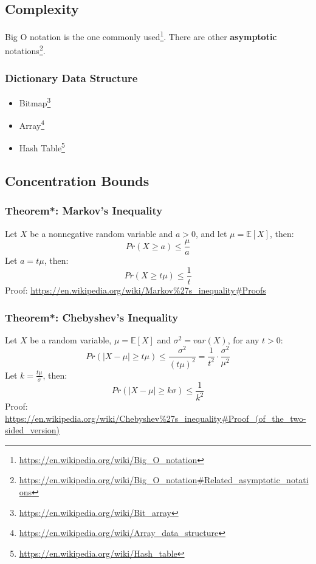 \documentclass[a4paper]{article}
\newcommand{\Expected}[1]{\mathbb{E}[#1]}
\begin{document}
\subsection{Complexity}

Big O notation is the one commonly used\footnote{\url{https://en.wikipedia.org/wiki/Big_O_notation}}. There are other \textbf{asymptotic} notations\footnote{\url{https://en.wikipedia.org/wiki/Big_O_notation\#Related_asymptotic_notations}}.

\subsubsection{Dictionary Data Structure}

\begin{itemize}
    \item Bitmap\footnote{\url{https://en.wikipedia.org/wiki/Bit_array}}
    \item Array\footnote{\url{https://en.wikipedia.org/wiki/Array_data_structure}}
    \item Hash Table\footnote{\url{https://en.wikipedia.org/wiki/Hash_table}}
\end{itemize}

\subsection{Concentration Bounds}

\subsubsection{Theorem*: Markov's Inequality}

Let $X$ be a nonnegative random variable and $a > 0$, and let $\mu = \Expected{X}$, then:
$$Pr(X \geq a) \leq \frac{\mu}{a}$$
Let $a = t\mu$, then:
$$Pr(X \geq t\mu) \leq \frac{1}{t}$$
Proof: \url{https://en.wikipedia.org/wiki/Markov\%27s_inequality\#Proofs}

\subsubsection{Theorem*: Chebyshev's Inequality}

Let $X$ be a random variable, $\mu = \Expected{X}$ and $\sigma^2 = var(X)$, for any $t > 0$:
$$Pr(|X - \mu| \geq t\mu) \leq \frac{\sigma^2}{(t\mu)^2} = \frac{1}{t^2} \cdot \frac{\sigma^2}{\mu^2}$$
Let $k = \frac{t\mu}{\sigma}$, then:
$$Pr(|X - \mu| \geq k\sigma) \leq \frac{1}{k^2}$$
Proof: \url{https://en.wikipedia.org/wiki/Chebyshev\%27s_inequality\#Proof_(of_the_two-sided_version)}
\end{document}
